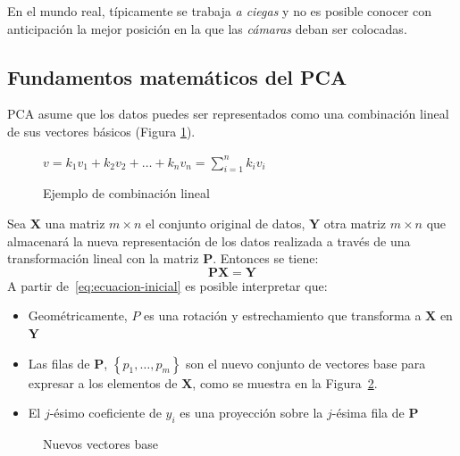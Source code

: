 \documentclass{article}
\begin{document}
En el mundo real, típicamente se trabaja \emph{a ciegas} y no es posible conocer con anticipación la mejor posición en la que las \emph{cámaras} deban ser colocadas.

\subsection{Fundamentos matemáticos del PCA}
\label{sub:fundamentos_matematicos_del_pca}
PCA asume que los datos puedes ser representados como una combinación lineal de sus vectores básicos (Figura \ref{fig:combinacion-lineal}).

\begin{figure}
	\centering
	$v = k_1v_1 + k_2v_2 + \ldots + k_nv_n = \sum_{i=1}^n k_iv_i$
	\caption{Ejemplo de combinación lineal}
	\label{fig:combinacion-lineal}
\end{figure}

Sea $\mathbf{X}$ una matriz $m \times n$ el conjunto original de datos, $\mathbf{Y}$ otra matriz $m \times n$ que almacenará la nueva representación de los datos realizada a través de una transformación lineal con la matriz $\mathbf{P}$.
Entonces se tiene:
\begin{equation}
\mathbf{PX} = \mathbf{Y}
\label{eq:ecuacion-inicial}
\end{equation}
A partir de~\ref{eq:ecuacion-inicial} es posible interpretar que:
\begin{itemize}
	\item Geométricamente, $P$ es una rotación y estrechamiento que transforma a $\mathbf{X}$ en $\mathbf{Y}$
	\item Las filas de $\mathbf{P}$, $\left \{ p_1,\ldots,p_m \right \}$ son el nuevo conjunto de vectores base para expresar a los elementos de $\mathbf{X}$, como se muestra en la Figura~\ref{fig:vectores-base}.
	\item El $j$-ésimo coeficiente de $y_i$ es una proyección sobre la $j$-ésima fila de $\mathbf{P}$
\end{itemize}

\begin{figure}
	\centering
	\caption{Nuevos vectores base}
	\label{fig:vectores-base}
\end{figure}
\end{document}
